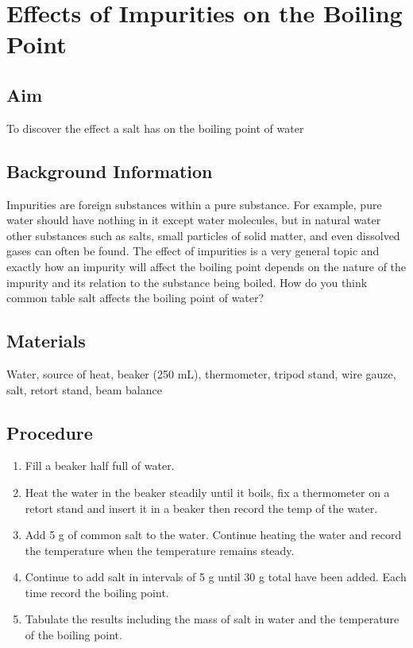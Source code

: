 \chapter{Effects of Impurities on the Boiling Point}

\section{Aim}
To discover the effect a salt has on the boiling point of water

\section{Background Information}
Impurities are foreign substances within a pure substance. For example, pure water should have nothing in it except water molecules, but in natural water other substances such as salts, small particles of solid matter, and even dissolved gases can often be found. The effect of impurities is a very general topic and exactly how an impurity will affect the boiling point depends on the nature of the impurity and its relation to the substance being boiled. How do you think common table salt affects the boiling point of water?

\section{Materials}
Water, source of heat, beaker (250 mL), thermometer, tripod stand, wire gauze, salt, retort stand, beam balance

\section{Procedure}
\begin{enumerate}
\item Fill a beaker half full of water.
\item Heat the water in the beaker steadily until it boils, fix a thermometer on a retort stand and insert it in a beaker then record the temp of the water.
\item Add 5 g of common salt to the water. Continue heating the water and record the temperature when the temperature remains steady.
\item Continue to add salt in intervals of 5 g until 30 g total have been added. Each time record the boiling point.
\item Tabulate the results including the mass of salt in water and the temperature of the boiling point.
\end{enumerate}

